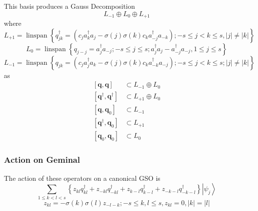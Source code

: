 \documentclass[aps,preprint]{revtex4}%
\begin{document}
This basis produces a Gauss Decomposition
\begin{equation}
L_{-1}\oplus L_{0}\oplus L_{+1}%
\end{equation}
where
\begin{equation}
L_{+1}=\operatorname*{linspan}\left\{  q_{jk}^{\dagger}=\left(  c_{j}%
a_{k}^{\dagger}a_{j}-\sigma\left(  j\right)  \sigma\left(  k\right)
c_{k}a_{-j}^{\dagger}a_{-k}\right)  ;-s\leq j<k\leq s,\left\vert j\right\vert
\neq\left\vert k\right\vert \right\}
\end{equation}%
\begin{equation}
L_{0}=\operatorname*{linspan}\left\{  q_{j-j}=a_{j}^{\dagger}a_{-j};-s\leq
j\leq s;a_{j}^{\dagger}a_{j}-a_{-j}^{\dagger}a_{-j},1\leq j\leq s\right\}
\end{equation}%
\begin{equation}
L_{-1}=\operatorname*{linspan}\left\{  q_{jk}=\left(  c_{j}a_{j}^{\dagger
}a_{k}-\sigma\left(  j\right)  \sigma\left(  k\right)  c_{k}a_{-k}^{\dagger
}a_{-j}\right)  ;-s\leq j<k\leq s;\left\vert j\right\vert \neq\left\vert
k\right\vert \right\}
\end{equation}
as
\begin{align}
\left[  \mathbf{q},\mathbf{q}\right]   &  \subset L_{-1}\oplus L_{0}\\
\left[  \mathbf{q}^{\dagger},\mathbf{q}^{\dagger}\right]   &  \subset
L_{+1}\oplus L_{0}\\
\left[  \mathbf{q},\mathbf{q}_{0}\right]   &  \subset L_{-1}\\
\left[  \mathbf{q}^{\dagger},\mathbf{q}_{0}\right]   &  \subset L_{+1}\\
\left[  \mathbf{q}_{0},\mathbf{q}_{0}\right]   &  \subset L_{0}%
\end{align}


\subsubsection{Action on Geminal}

The action of these operators on a canonical GSO is%
\begin{equation}
\sum_{1\leq k<l<s}\left\{  z_{kl}q_{kl}^{\dagger}+z_{-kl}q_{-kl}^{\dagger
}+z_{k-l}q_{k-l}^{\dagger}+z_{-k-l}q_{-k-l}^{\dagger}\right\}  \left\vert
\psi_{j}\right\rangle
\end{equation}%
\begin{equation}
z_{kl}=-\sigma\left(  k\right)  \sigma\left(  l\right)  z_{-l-k};-s\leq
k,l\leq s,z_{kl}=0,\left\vert k\right\vert =\left\vert l\right\vert
\end{equation}
\end{document}
